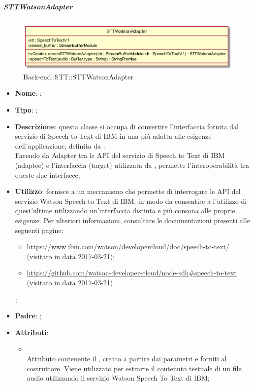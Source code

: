 \hypertarget{STTWatsonAdapter_label}{\subparagraph{STTWatsonAdapter}}
\begin{figure}[h]
	\centering
	\includegraphics[width=\textwidth,height=\textheight,keepaspectratio]{images/ClassSTTWatsonAdapter.png}
	\caption{Back-end::STT::STTWatsonAdapter}
\end{figure}
\begin{itemize}
	\item \textbf{Nome}: ;
	\item \textbf{Tipo}: ;
	\item \textbf{Descrizione}: questa classe si occupa di convertire l'interfaccia fornita dal servizio di Speech to Text di IBM in una più adatta alle esigenze dell'applicazione, definita da . \\
Facendo da Adapter tra le API del servizio di Speech to Text di IBM (adaptee) e l'interfaccia  (target) utilizzata da , permette l'interoperabilità tra queste due interfacce;
	\item \textbf{Utilizzo}: fornisce a  un meccanismo che permette di interrogare le API del servizio Watson Speech to Text di IBM, in modo da consentire a  l'utilizzo di quest'ultime utilizzando un'interfaccia distinta e più consona alle proprie esigenze.
Per ulteriori informazioni, consultare le documentazioni presenti alle seguenti pagine:
\begin{itemize}
    \item \url{https://www.ibm.com/watson/developercloud/doc/speech-to-text/}  (visitato in data 2017-03-21);
    \item \url{https://github.com/watson-developer-cloud/node-sdk#speech-to-text}  (visitato in data 2017-03-21).
\end{itemize};
	\item \textbf{Padre}: ;
	\item \textbf{Attributi}:
	\begin{itemize}
		\item[]  \\
		Attributo contenente il , creato a partire dai parametri  e  forniti al costruttore. Viene utilizzato per estrarre il contenuto testuale di un file audio utilizzando il servizio Watson Speech To Text di IBM;

\end{itemize}
\end{itemize}
